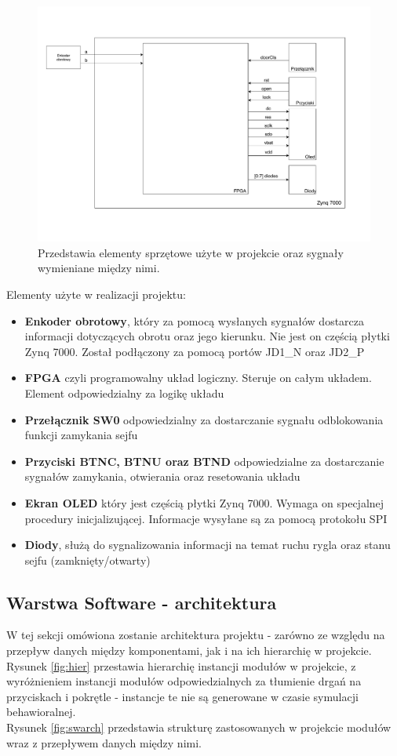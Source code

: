 \documentclass[12pt] {article}
\begin{document}
\begin{figure}[H]
\centering
\includegraphics[width=1.1\textwidth]{res/hardware_architecture.pdf}
\caption{Przedstawia elementy sprzętowe użyte w projekcie oraz sygnały wymieniane między nimi.} 
\end{figure}
\label{fig:hwarch}
\newpage

Elementy użyte w realizacji projektu:
\begin{itemize}
\item \textbf{Enkoder obrotowy}, który za pomocą wysłanych sygnałów dostarcza informacji dotyczących obrotu oraz jego kierunku. Nie jest on częścią płytki Zynq 7000. Został podłączony za pomocą portów JD1\_N oraz JD2\_P
\item \textbf{FPGA} czyli programowalny układ logiczny. Steruje on całym układem. Element odpowiedzialny za logikę układu
\item \textbf{Przełącznik SW0} odpowiedzialny za dostarczanie sygnału odblokowania funkcji zamykania sejfu
\item \textbf{Przyciski BTNC, BTNU oraz BTND} odpowiedzialne za dostarczanie sygnałów zamykania, otwierania oraz resetowania układu
\item \textbf{Ekran OLED} który jest częścią płytki Zynq 7000. Wymaga on specjalnej procedury inicjalizującej. Informacje wysyłane są za pomocą protokołu SPI
\item \textbf{Diody}, służą do sygnalizowania informacji na temat ruchu rygla oraz stanu sejfu (zamknięty/otwarty) 
\end{itemize}

\newpage
\subsection{Warstwa Software - architektura}
W tej sekcji omówiona zostanie architektura projektu - zarówno ze względu na przepływ danych między komponentami, jak i na ich hierarchię w projekcie. \\
Rysunek \ref{fig:hier} przestawia hierarchię instancji modułów w projekcie, z wyróżnieniem instancji modułów odpowiedzialnych za tłumienie drgań na przyciskach i pokrętle - instancje te nie są generowane w czasie symulacji behawioralnej. \\
Rysunek \ref{fig:swarch} przedstawia strukturę zastosowanych w projekcie modułów wraz z przepływem danych między nimi. 
\end{document}

